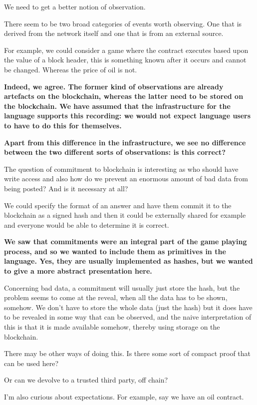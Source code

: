 \documentclass[
      acmsmall
    , screen
    , review=true
  ]{acmart}
\begin{document}
We need to get a better notion of observation. 


There seem to be two broad categories of events worth observing. One that is derived from the network itself and one that is from an external source. 


For example, we could consider a game where the contract executes based upon the value of a block header, this is something known after it occurs and cannot be changed.
Whereas the price of oil is not.



{\bf
Indeed, we agree. The former kind of observations are already artefacts on the blockchain, whereas the latter need to be stored on the blockchain. We have assumed that the infrastructure for the language supports this recording: we would not expect language users to have to do this for themselves.
}

{\bf
Apart from this difference in the infrastructure, we see no difference between the two different sorts of observations: is this correct?
}

The question of commitment to blockchain is interesting as who should have write access and also how do we prevent an enormous amount of bad data from being posted? And is it necessary at all?


We could specify the format of an answer and have them commit it to the blockchain as a signed hash and then it could be externally shared for example and everyone would be able to determine it is correct.

{\bf
We saw that commitments were an integral part of the game playing process, and so we wanted to include them as primitives in the language. Yes, they are usually implemented as hashes, but we wanted to give a more abstract presentation here. 


Concerning bad data, a commitment will usually just store the hash, but the problem seems to come at the reveal, when all the data has to be shown, somehow. We don't have to store the whole data (just the hash) but it does have to be revealed in some way that can be observed, and the naive interpretation of this is that it is made available somehow, thereby using storage on the blockchain.


There may be other ways of doing this. Is there some sort of compact proof that can be used here?


Or can we devolve to a trusted third party, off chain?
}

I'm also curious about expectations. For example, say we have an oil contract.
\end{document}
